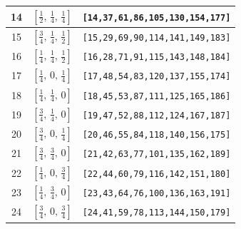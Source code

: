 \documentclass[fleqn,8pt]{jsarticle}
\begin{document}
\begin{longtable}{ccc}
14 & $\left[ \frac{1}{2},\, \frac{1}{4},\, \frac{1}{4} \right]$ & {\tt [14,37,61,86,105,130,154,177]} \\ \hline
15 & $\left[ \frac{3}{4},\, \frac{1}{4},\, \frac{1}{2} \right]$ & {\tt [15,29,69,90,114,141,149,183]} \\ \hline
16 & $\left[ \frac{1}{4},\, \frac{1}{4},\, \frac{1}{2} \right]$ & {\tt [16,28,71,91,115,143,148,184]} \\ \hline
17 & $\left[ \frac{1}{4},\, 0,\, \frac{1}{4} \right]$ & {\tt [17,48,54,83,120,137,155,174]} \\ \hline
18 & $\left[ \frac{1}{4},\, \frac{1}{4},\, 0 \right]$ & {\tt [18,45,53,87,111,125,165,186]} \\ \hline
19 & $\left[ \frac{3}{4},\, \frac{1}{4},\, 0 \right]$ & {\tt [19,47,52,88,112,124,167,187]} \\ \hline
20 & $\left[ \frac{3}{4},\, 0,\, \frac{1}{4} \right]$ & {\tt [20,46,55,84,118,140,156,175]} \\ \hline
21 & $\left[ \frac{3}{4},\, \frac{3}{4},\, 0 \right]$ & {\tt [21,42,63,77,101,135,162,189]} \\ \hline
22 & $\left[ \frac{1}{4},\, 0,\, \frac{3}{4} \right]$ & {\tt [22,44,60,79,116,142,151,180]} \\ \hline
23 & $\left[ \frac{1}{4},\, \frac{3}{4},\, 0 \right]$ & {\tt [23,43,64,76,100,136,163,191]} \\ \hline
24 & $\left[ \frac{3}{4},\, 0,\, \frac{3}{4} \right]$ & {\tt [24,41,59,78,113,144,150,179]} \\
\end{longtable}
\renewcommand{\arraystretch}{1.2}
\end{document}
